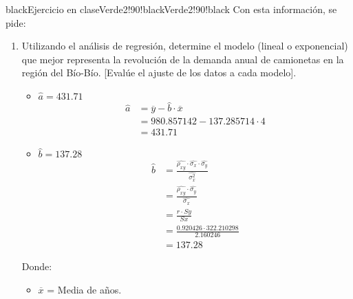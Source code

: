 \documentclass{templateNote}
\begin{document}
\begin{CuadroPersonalizado}{black}{Ejercicio en clase}{Verde2!90!black}{Verde2!90!black}
  Con esta información, se pide:
  \begin{enumerate}
    \item Utilizando el análisis de regresión, determine el modelo (lineal o exponencial) que mejor representa la revolución de la demanda anual de camionetas en la región del Bío-Bío. [Evalúe el ajuste de los datos a cada modelo].
    \begin{itemize}
      \item $\widehat{a} = 431.71$
      \begin{align*}
        \widehat{a} &= \overline{y} - \widehat{b} \cdot \overline{x} \\
        &= 980.857142 - 137.285714 \cdot 4 \\
        &= 431.71
      \end{align*}
      \item $\widehat{b} = 137.28$
      \begin{align*}
        \widehat{b} &= \frac{\widehat{\rho_{xy}} \cdot \widehat{\sigma_x} \cdot \widehat{\sigma_y}}{\widehat{\sigma_x^2}} \\
        &=  \frac{\widehat{\rho_{xy}} \cdot \widehat{\sigma_y}}{\widehat{\sigma_x}} \\
        &= \frac{r \cdot Sy}{Sx} \\
        &= \frac{0.920426 \cdot 322.210298}{2.160246} \\
        &= 137.28
      \end{align*}
    \end{itemize}
    Donde:
    \begin{itemize}
      \item $\overline{x}$ = Media de años.
    \end{itemize}
  \end{enumerate}
\end{CuadroPersonalizado}

\newpage
\end{document}
